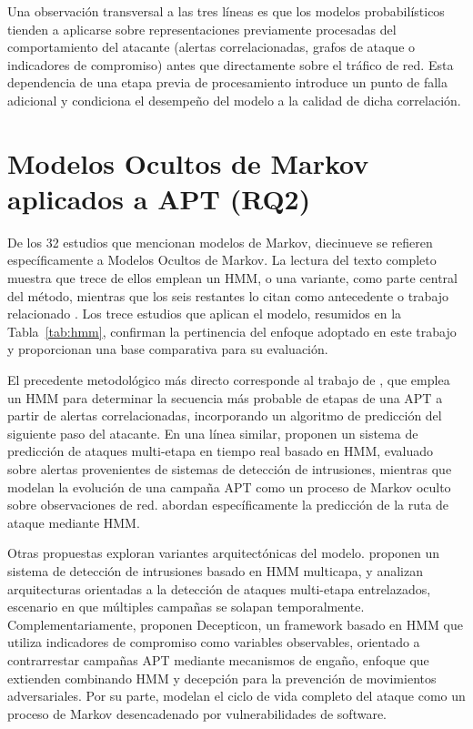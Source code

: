 Una observación transversal a las tres líneas es que los modelos probabilísticos tienden a aplicarse sobre representaciones previamente procesadas del comportamiento del atacante (alertas correlacionadas, grafos de ataque o indicadores de compromiso) antes que directamente sobre el tráfico de red. Esta dependencia de una etapa previa de procesamiento introduce un punto de falla adicional y condiciona el desempeño del modelo a la calidad de dicha correlación.


\section{Modelos Ocultos de Markov aplicados a APT (RQ2)}
\label{sec:rq2}

De los 32 estudios que mencionan modelos de Markov, diecinueve se refieren específicamente a Modelos Ocultos de Markov. La lectura del texto completo muestra que trece de ellos emplean un HMM, o una variante, como parte central del método, mientras que los seis restantes lo citan como antecedente o trabajo relacionado \parencite{g_ioannou_markov_2019,m_khosravi_alerts_2020,javed_apt_2023,kim_ban_2023,nicho_enhanced_2025,s_lee_aptstop_2025}. Los trece estudios que aplican el modelo, resumidos en la Tabla~\ref{tab:hmm}, confirman la pertinencia del enfoque adoptado en este trabajo y proporcionan una base comparativa para su evaluación.

El precedente metodológico más directo corresponde al trabajo de \textcite{ghafir2019hmm}, que emplea un HMM para determinar la secuencia más probable de etapas de una APT a partir de alertas correlacionadas, incorporando un algoritmo de predicción del siguiente paso del atacante. En una línea similar, \textcite{holgado_real-time_2020} proponen un sistema de predicción de ataques multi-etapa en tiempo real basado en HMM, evaluado sobre alertas provenientes de sistemas de detección de intrusiones, mientras que \textcite{brogi_hidden_2019} modelan la evolución de una campaña APT como un proceso de Markov oculto sobre observaciones de red. \textcite{du_attack_2019} abordan específicamente la predicción de la ruta de ataque mediante HMM.

Otras propuestas exploran variantes arquitectónicas del modelo. \textcite{zegeye_multi-layer_2019} proponen un sistema de detección de intrusiones basado en HMM multicapa, y \textcite{t_shawly_architectures_2021} analizan arquitecturas orientadas a la detección de ataques multi-etapa entrelazados, escenario en que múltiples campañas se solapan temporalmente. Complementariamente, \textcite{baksi_decepticon_2021} proponen Decepticon, un framework basado en HMM que utiliza indicadores de compromiso como variables observables, orientado a contrarrestar campañas APT mediante mecanismos de engaño, enfoque que \textcite{al_amin_hidden_2021} extienden combinando HMM y decepción para la prevención de movimientos adversariales. Por su parte, \textcite{hoffmann_markov_2021} modelan el ciclo de vida completo del ataque como un proceso de Markov desencadenado por vulnerabilidades de software.

